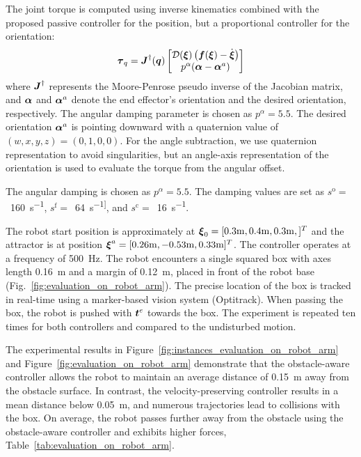 The joint torque is computed using inverse kinematics combined with the proposed passive controller for the position, but a proportional controller for the orientation:
\begin{equation}
	\boldsymbol{\tau}_q = \boldsymbol{J}^{\dag}(\boldsymbol{q}) 
	\begin{bmatrix} \mathcal{D}(\boldsymbol{\xi}) \left( \boldsymbol{f}(\boldsymbol{\xi}) - \dot{\boldsymbol{\xi}} \right) \\  p^\alpha (\boldsymbol{\alpha} - \boldsymbol{\alpha}^a) \end{bmatrix}
\end{equation}
where $\boldsymbol{J}^{\dag}$ represents the Moore-Penrose pseudo inverse of the Jacobian matrix, and $\boldsymbol{\alpha}$ and $\boldsymbol{\alpha}^a$ denote the end effector's orientation and the desired orientation, respectively. The angular damping parameter is chosen as $p^\alpha = 5.5$.
The desired orientation $\boldsymbol{\alpha}^a$ is pointing downward with a quaternion value of $(w, x, y, z) = (0, 1, 0, 0)$. For the angle subtraction, we use quaternion representation to avoid singularities, but an angle-axis representation of the orientation is used to evaluate the torque from the angular offset.

The angular damping is chosen as $p^\alpha = 5.5$.
The damping values are set as
$s^{\mathrm{o}}=$~\qty{160}{s^{-1}},
$s^{\mathrm{f}}=$~\qty{64}{s^{-1]}}, and
$s^{\mathrm{c}}=$~\qty{16}{s^{-1}}.

The robot start position is approximately at $\boldsymbol{\xi}_0 = [0.3\mathrm{m}, 0.4\mathrm{m}, 0.3\mathrm{m},]^T$ and the attractor is at position $\boldsymbol{\xi}^a = [0.26 \mathrm{m}, -0.53\mathrm{m}, 0.33\mathrm{m}]^T$. The controller operates at a frequency of \qty{500}{Hz}.
The robot encounters a single squared box with axes length \qty{0.16}{m} and a margin of \qty{0.12}{m}, placed in front of the robot base (Fig.~\ref{fig:evaluation_on_robot_arm}). The precise location of the box is tracked in real-time using a marker-based vision system (Optitrack). When passing the box, the robot is pushed with $\boldsymbol{t}^e$ towards the box. The experiment is repeated ten times for both controllers and compared to the undisturbed motion.

\iflong
The experimental results in \ifthesis Figure~\ref{fig:instances_evaluation_on_robot_arm} and \fi Figure~\ref{fig:evaluation_on_robot_arm} demonstrate that the obstacle-aware controller allows the robot to maintain an average distance of \qty{0.15}{m} away from the obstacle surface. In contrast, the velocity-preserving controller results in a mean distance below \qty{0.05}{m}, and numerous trajectories lead to collisions with the box. On average, the robot passes further away from the obstacle using the obstacle-aware controller and exhibits higher forces, Table~\ref{tab:evaluation_on_robot_arm}.
\fi

